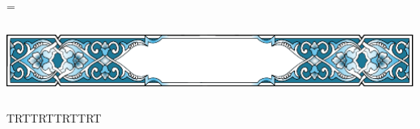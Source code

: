 \documentclass{article}
\begin{document}

\setbox\ayaframe=\centerline{\hbox{\includegraphics[width=1\textwidth,height=65pt]{ayaframe.pdf}}}

\medinafontvar\pagedir TRT\pardir TRT\bodydir TRT\textdir TRT

\sloppy

\end{document}
